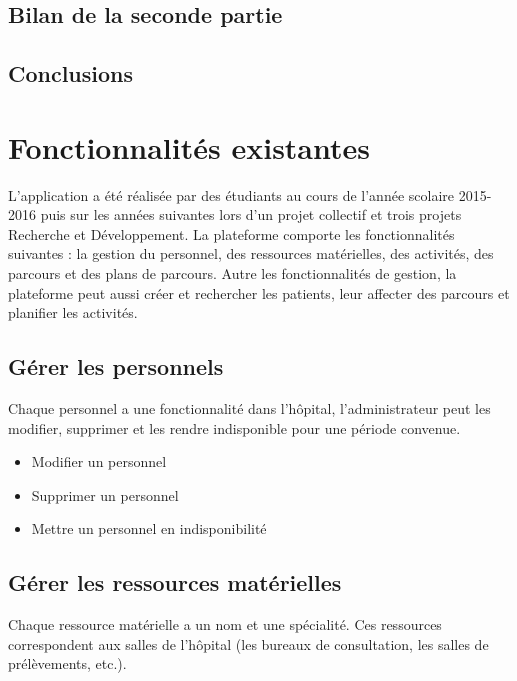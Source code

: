 \documentclass[noposter]{polytech/polytech}
\begin{document}
\section*{Bilan de la seconde partie}


\section*{Conclusions}



\appendix

\chapter{Fonctionnalités existantes}
\label{ann:foncExist}

L'application a été réalisée par des étudiants au cours de l'année scolaire 2015-2016 puis sur les années suivantes lors d'un projet collectif et trois projets Recherche et Développement. La plateforme comporte les fonctionnalités suivantes : la gestion du personnel, des ressources matérielles, des activités, des parcours et des plans de parcours. Autre les fonctionnalités de gestion, la plateforme peut aussi créer et rechercher les patients, leur affecter des parcours et planifier les activités.


\section{Gérer les personnels}

Chaque personnel a une fonctionnalité dans l'hôpital, l'administrateur peut les modifier, supprimer et les rendre indisponible pour une période convenue.

\begin{itemize}
	\item Modifier un personnel
	\item Supprimer un personnel
	\item Mettre un personnel en indisponibilité
\end{itemize}

\section{Gérer les ressources matérielles}

Chaque ressource matérielle a un nom et une spécialité. Ces ressources correspondent aux salles de l'hôpital (les bureaux de consultation, les salles de prélèvements, etc.).
\end{document}

